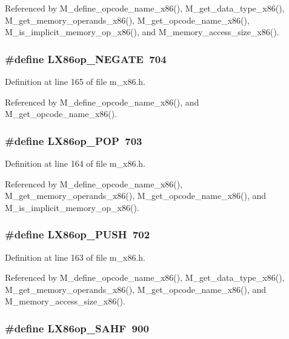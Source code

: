 Referenced by M\_\-define\_\-opcode\_\-name\_\-x86(), M\_\-get\_\-data\_\-type\_\-x86(), M\_\-get\_\-memory\_\-operands\_\-x86(), M\_\-get\_\-opcode\_\-name\_\-x86(), M\_\-is\_\-implicit\_\-memory\_\-op\_\-x86(), and M\_\-memory\_\-access\_\-size\_\-x86().
\subsubsection{\setlength{\rightskip}{0pt plus 5cm}\#define LX86op\_\-NEGATE~704}\label{m__x86_8h_8b9603e25142445673ca7a3f2b02f0e1}




Definition at line 165 of file m\_\-x86.h.

Referenced by M\_\-define\_\-opcode\_\-name\_\-x86(), and M\_\-get\_\-opcode\_\-name\_\-x86().
\subsubsection{\setlength{\rightskip}{0pt plus 5cm}\#define LX86op\_\-POP~703}\label{m__x86_8h_27e9fc2e2adf60cf1d4bb0c1d6469889}




Definition at line 164 of file m\_\-x86.h.

Referenced by M\_\-define\_\-opcode\_\-name\_\-x86(), M\_\-get\_\-memory\_\-operands\_\-x86(), M\_\-get\_\-opcode\_\-name\_\-x86(), and M\_\-is\_\-implicit\_\-memory\_\-op\_\-x86().
\subsubsection{\setlength{\rightskip}{0pt plus 5cm}\#define LX86op\_\-PUSH~702}\label{m__x86_8h_a84df4eb78f2dc2a0e7ebc47ceb5a3be}




Definition at line 163 of file m\_\-x86.h.

Referenced by M\_\-define\_\-opcode\_\-name\_\-x86(), M\_\-get\_\-data\_\-type\_\-x86(), M\_\-get\_\-memory\_\-operands\_\-x86(), M\_\-get\_\-opcode\_\-name\_\-x86(), and M\_\-memory\_\-access\_\-size\_\-x86().
\subsubsection{\setlength{\rightskip}{0pt plus 5cm}\#define LX86op\_\-SAHF~900}\label{m__x86_8h_1ac2b552c7d3319cb5f1625a24fb1cdd}




